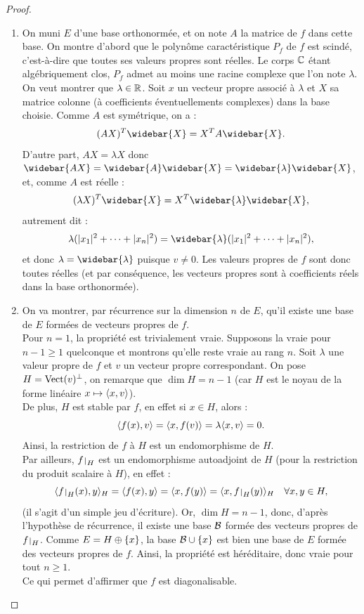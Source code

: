 \begin{proof}
\begin{enumerate}[label=(\alph*)]

\item
On muni $E$ d'une base orthonormée, et on note $A$ la matrice de $f$ dans cette base. 
On montre d'abord que le polynôme caractéristique $P_f$ de $f$ est scindé, c'est-à-dire que toutes ses valeurs propres sont réelles.
Le corps $\mathbb{C}$ étant algébriquement clos, $P_f$ admet au moins une racine complexe que l'on note $\lambda$.
On veut montrer que $\lambda \in \mathbb{R}$. 
Soit $x$ un vecteur propre associé à $\lambda$ et $X$ sa matrice colonne (à coefficients éventuellements complexes) dans la base
choisie. Comme $A$ est symétrique, on a :
\[ (AX)^T \widebar{X} = X^T A \widebar{X} . \]
D'autre part, $AX = \lambda X$ donc $\widebar{AX} = \widebar{A} \widebar{X} = \widebar{\lambda} \widebar{X}$, 
et, comme $A$ est réelle :
\[ (\lambda X)^T \widebar{X} = X^T \widebar{\lambda} \widebar{X}, \]
autrement dit :
\[ \lambda (\abs{x_1}^2 + \dots + \abs{x_n}^2) = \widebar{\lambda} (\abs{x_1}^2 + \dots + \abs{x_n}^2) , \]
et donc $\lambda =  \widebar{\lambda}$ puisque $v \neq 0$. Les valeurs propres de $f$ sont donc toutes réelles 
(et par conséquence, les vecteurs propres sont à coefficients réels dans la base orthonormée).

\item
On va montrer, par récurrence sur la dimension $n$ de $E$, qu'il existe une base de $E$ formées de vecteurs propres de $f$. \\
Pour $n=1$, la propriété est trivialement vraie.
Supposons la vraie pour $n-1 \geq 1$ quelconque et montrons qu'elle reste vraie au rang $n$. 
Soit $\lambda$ une valeur propre de $f$ et $v$ un vecteur propre correspondant. 
On pose $H = \operatorname{Vect}(v)^{\perp}$, on remarque que $\dim{H} = n-1$ (car $H$ est le noyau de la forme linéaire $x \mapsto\langle x,v\rangle$). \\
De plus, $H$ est stable par $f$, en effet si $x \in H$, alors :
\[ \langle f(x), v\rangle = \langle x, f(v)\rangle = \lambda \langle x, v\rangle = 0 . \]
Ainsi, la restriction de $f$ à $H$ est un endomorphisme de $H$. \\
Par ailleurs, $\restr{f}{H}$ est un endomorphisme autoadjoint de $H$ (pour la restriction du produit scalaire à $H$), en effet :
\[ \angl{\restr{f}{H}(x), y}_H = \angl{f(x) , y} = \angl{x, f(y)} = \angl{x, \restr{f}{H}(y)}_H \quad \forall x, y \in H  ,\]
(il s'agit d'un simple jeu d'écriture). Or, $\dim{H} = n-1$, donc, d'après l'hypothèse de récurrence, il existe une base $\mathcal{B}$ formée
des vecteurs propres de $\restr{f}{H}$. Comme $E = H \oplus \{ x \}$, 
la base $\mathcal{B} \cup \{ x \}$ est bien une base de $E$ formée des vecteurs propres de $f$. 
Ainsi, la propriété est héréditaire, donc vraie pour tout $n \geq 1$. \\
Ce qui permet d'affirmer que $f$ est diagonalisable.


\end{enumerate}
\end{proof}
